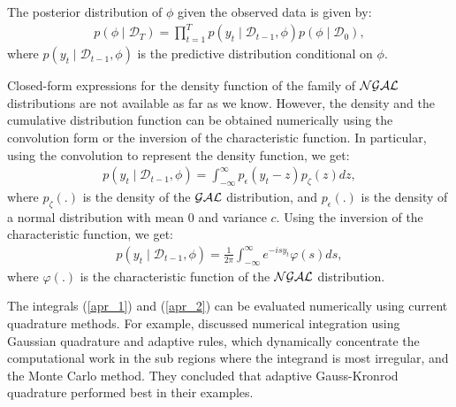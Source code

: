 \documentclass[12pt,a4paper]{article}\usepackage[]{graphicx}\usepackage[]{color}\usepackage{subfigure}
\newcommand{\mathD}{\mathcal{D}}
\begin{document}
The posterior distribution of $\phi$ given the observed data is given by:
\begin{align}\label{loglik}
 p(\phi \mid \mathD_T) = \prod_{t=1}^{T}  p(y_t\mid\mathD_{t-1}, \phi)p(\phi\mid \mathD_{0}), 
\end{align}
where $p(y_t\mid \mathD_{t-1}, \phi)$ is the predictive distribution conditional on $\phi$. 

Closed-form expressions for the density function of the family of $\cal{NGAL}$ distributions are not available as far as we know. 
However, the density and the cumulative distribution function can be obtained numerically using the convolution form or the inversion of the characteristic function. In particular, using the convolution to represent the 
density function, we get:
\begin{align}\label{apr_1}
p(y_t\mid \mathD_{t-1}, \phi) = \int_{-\infty}^{\infty}{p_{\epsilon}(y_t-z)p_{\zeta}(z)dz},
\end{align}
where $p_{\zeta}(.)$ is the density of the $\cal{GAL}$ distribution, and $p_{\epsilon}(.)$ is the density of a normal distribution with mean $0$ 
and variance $c$. Using the inversion of the characteristic function, we get:
\begin{align}\label{apr_2}
p(y_t\mid \mathD_{t-1}, \phi) = \frac{1}{2\pi}\int_{-\infty}^{\infty}{e^{-isy_t}\varphi(s)ds},
\end{align}
where $\varphi(.)$ is the characteristic function of the $\cal{NGAL}$ distribution.

The integrals (\ref{apr_1}) and (\ref{apr_2}) can be evaluated numerically using current quadrature methods. 
For example, \cite{kuonen2003numerical} discussed numerical integration using Gaussian quadrature and adaptive rules, which dynamically concentrate the computational work in the sub regions where the integrand is most irregular, and the Monte Carlo method. 
They concluded that adaptive Gauss-Kronrod quadrature performed best in their examples.
\end{document}
